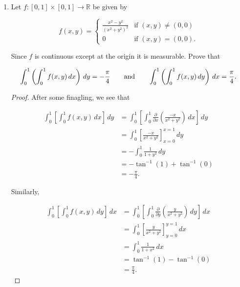 \documentclass[11pt,oneside,english]{amsart}
\theoremstyle{definition}
\newcommand{\aspace}{\hspace{7mm}\text{and}\hspace{7mm}}
\newcommand{\R}{\mathbb{R}}
\newcommand{\pp}[2]{\frac{\partial{#1}}{\partial{#2}}}
\begin{document}
\begin{enumerate}
\begin{proof}
This does not violate Fubini's theorem because $f\notin L^1(\mu\times\nu)$ so Fubini's theorem does not apply. Indeed, this function serves as a counterexample which illustrates the necessary condition that $f\in L^1(\mu\times\nu)$ for Fubini's theorem to hold. Observe that

\begin{align*}
\int_{\mathbb{N}\times \mathbb{N}}|f|\,d(\mu\times \nu)&=\int_{\{n\geq m\}}|f|\,d(\mu\times \nu)+\int_{\{n<m\}}|f|\,d(\mu\times \nu)\\[2mm]
&=\int_{\{n\geq m\}}1\,d(\mu\times \nu)+\int_{\{n<m\}}1\,d(\mu\times \nu)\\[2mm]
&=\mu\times\nu(\{n\geq m\})+\mu\times\nu(\{n<m\})\\[2mm]
&=\infty +\infty \\[2mm]
&=\infty,
\end{align*}

so $f\notin L^1(\mu\times\nu)$.
\end{proof}


\item Let $f:[0,1]\times[0,1]\rightarrow \R$ be given by

\[
f(x,y)=\begin{cases}\frac{x^2-y^2}{(x^2+y^2)^2} & \text{if }(x,y)\neq(0,0)\\ 0 & \text{if }(x,y)=(0,0).\end{cases}
\]

Since $f$ is continuous except at the origin it is measurable. Prove that

\[
\int_0^1\left(\int_0^1f(x,y)\,dx\right)\,dy=-\frac{\pi}{4}\aspace \int_0^1\left(\int_0^1f(x,y)\,dy\right)\,dx=\frac{\pi}{4}.
\]

\begin{proof}

After some finagling, we see that

\begin{align*}
\int_0^1\left[\int_0^1f(x,y)\,dx\right]\,dy&=\int_0^1\left[\int_0^1\pp{}{x}\left(\frac{-x}{x^2+y^2}\right)\,dx\right]\,dy\\[2mm]
&=\int_0^1\left[\frac{-x}{x^2+y^2}\right]_{x=0}^{x=1}\,dy\\[2mm]
&=-\int_0^1\frac{1}{1+y^2}\,dy\\[2mm]
&=-\tan^{-1}(1)+\tan^{-1}(0)\\[2mm]
&=-\frac{\pi}{4}.
\end{align*}

Similarly,

\begin{align*}
\int_0^1\left[\int_0^1f(x,y)\,dy\right]\,dx&=\int_0^1\left[\int_0^1\pp{}{y}\left(\frac{y}{x^2+y^2}\right)\,dy\right]\,dx\\[2mm]
&=\int_0^1\left[\frac{y}{x^2+y^2}\right]_{y=0}^{y=1}\,dx\\[2mm]
&=\int_0^1\frac{1}{1+x^2}\,dx\\[2mm]
&=\tan^{-1}(1)-\tan^{-1}(0)\\[2mm]
&=\frac{\pi}{4}.
\end{align*}


\end{proof}
\end{enumerate}
\end{document}
